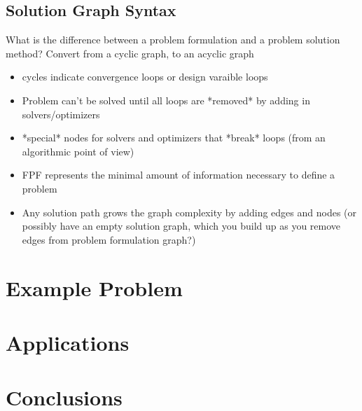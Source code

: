\documentclass[]{aiaa-tc} %
\begin{document}
    \subsection{Solution Graph Syntax}
    What is the difference between a problem formulation and a problem solution method? Convert from a cyclic graph, to an acyclic graph
    \begin{itemize}
        \item cycles indicate convergence loops or design varaible loops
        \item Problem can't be solved until all loops are *removed* by adding in solvers/optimizers
        \item *special* nodes for solvers and optimizers that *break* loops (from an algorithmic point of view)
        \item FPF represents the minimal amount of information necessary to define a problem
        \item Any solution path grows the graph complexity by adding edges and nodes (or possibly have an empty solution graph, which you build up 
        as you remove edges from problem formulation graph?)
    \end{itemize}

    
\section{Example Problem}

\section{Applications}

\section{Conclusions}


\end{document}
